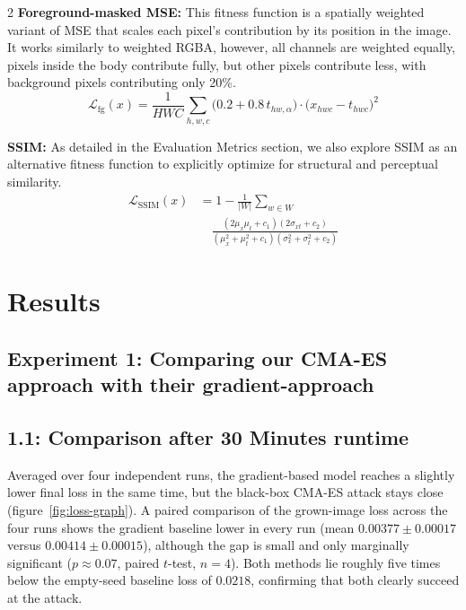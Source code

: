\documentclass{article}
\begin{document}
\begin{multicols}{2}
\textbf{Foreground-masked MSE: } %
This fitness function is a spatially weighted variant of MSE that scales each pixel's contribution by its position in the image. 
It works similarly to weighted RGBA, however, all channels are weighted equally, pixels inside the body contribute fully, but other pixels contribute less, with background pixels contributing only 20\%. 
\begin{equation*}
  \mathcal{L}_{\mathrm{fg}}(x) = \frac{1}{HWC}\sum_{h,w,c}
  \bigl(0.2 + 0.8\,t_{hw,\alpha}\bigr)\cdot\bigl(x_{hwc} - t_{hwc}\bigr)^2
\end{equation*}


\textbf{SSIM: }
As detailed in the Evaluation Metrics section, we also explore SSIM \cite{wang2004image} as an alternative fitness function to explicitly optimize for structural and perceptual similarity.
\begin{equation*}
\begin{split}
  \mathcal{L}_{\mathrm{SSIM}}(x) &= 1 - \frac{1}{|W|}\sum_{w\in W} \\
  &\quad \frac{(2\mu_x\mu_t + c_1)(2\sigma_{xt} + c_2)}{(\mu_x^2+\mu_t^2+c_1)(\sigma_x^2+\sigma_t^2+c_2)}
\end{split}
\end{equation*}


\section*{Results}

\subsection*{Experiment 1: Comparing our CMA-ES approach with their gradient-approach}
\subsection*{1.1: Comparison after 30 Minutes runtime}

Averaged over four independent runs, the gradient-based model reaches a slightly lower final loss in the same time, but the black-box CMA-ES attack stays close (figure~\ref{fig:loss-graph}). A paired comparison of the grown-image loss across the four runs shows the gradient baseline lower in every run (mean $0.00377 \pm 0.00017$ versus $0.00414 \pm 0.00015$), although the gap is small and only marginally significant ($p \approx 0.07$, paired $t$-test, $n=4$). Both methods lie roughly five times below the empty-seed baseline loss of $0.0218$, confirming that both clearly succeed at the attack.


\end{multicols}
\end{document}
